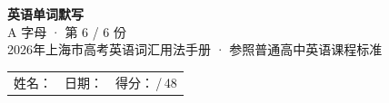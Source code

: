 \documentclass[10pt,a4paper]{article}
\begin{document}
\pagestyle{plain}

\begin{center}
{\LARGE\bfseries 英语单词默写}\\[0.22em]
{\large A 字母 · 第 6 / 6 份}\\[0.18em]
{\small 2026年上海市高考英语词汇用法手册 · 参照普通高中英语课程标准}
\end{center}

\vspace{0.25em}
\noindent\begin{tabular}{@{}p{}@{}p{}@{}p{}@{}}
姓名：\underline{\hspace{2.0cm}} & 日期：\underline{\hspace{2.0cm}} & 得分：\underline{\hspace{1.3cm}}\,/\,48 \\
\end{tabular}

\vspace{0.3em}

\vspace{0.08em}
\end{document}
